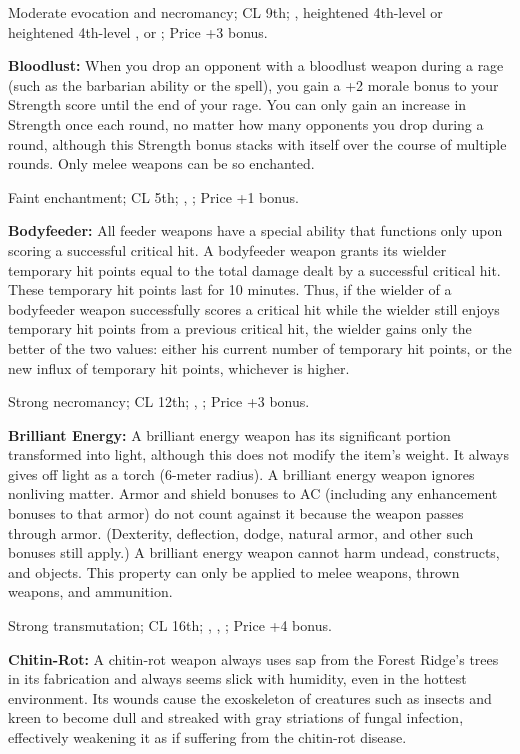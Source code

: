 Moderate evocation and necromancy; CL 9th; , heightened 4th-level  or heightened 4th-level ,  or ; Price +3 bonus.

\textbf{Bloodlust:} When you drop an opponent with a bloodlust weapon during a rage (such as the barbarian ability or the spell), you gain a +2 morale bonus to your Strength score until the end of your rage. You can only gain an increase in Strength once each round, no matter how many opponents you drop during a round, although this Strength bonus stacks with itself over the course of multiple rounds. Only melee weapons can be so enchanted.

Faint enchantment; CL 5th; , ; Price +1 bonus.

\textbf{Bodyfeeder:} All feeder weapons have a special ability that functions only upon scoring a successful critical hit. A bodyfeeder weapon grants its wielder temporary hit points equal to the total damage dealt by a successful critical hit. These temporary hit points last for 10 minutes. Thus, if the wielder of a bodyfeeder weapon successfully scores a critical hit while the wielder still enjoys temporary hit points from a previous critical hit, the wielder gains only the better of the two values: either his current number of temporary hit points, or the new influx of temporary hit points, whichever is higher.

Strong necromancy; CL 12th; , ; Price +3 bonus.

\textbf{Brilliant Energy:} A brilliant energy weapon has its significant portion transformed into light, although this does not modify the item's weight. It always gives off light as a torch (6-meter radius). A brilliant energy weapon ignores nonliving matter. Armor and shield bonuses to AC (including any enhancement bonuses to that armor) do not count against it because the weapon passes through armor. (Dexterity, deflection, dodge, natural armor, and other such bonuses still apply.) A brilliant energy weapon cannot harm undead, constructs, and objects. This property can only be applied to melee weapons, thrown weapons, and ammunition.

Strong transmutation; CL 16th; , , ; Price +4 bonus.

\textbf{Chitin-Rot:} A chitin-rot weapon always uses sap from the Forest Ridge's trees in its fabrication and always seems slick with humidity, even in the hottest environment. Its wounds cause the exoskeleton of creatures such as insects and kreen to become dull and streaked with gray striations of fungal infection, effectively weakening it as if suffering from the chitin-rot disease.

